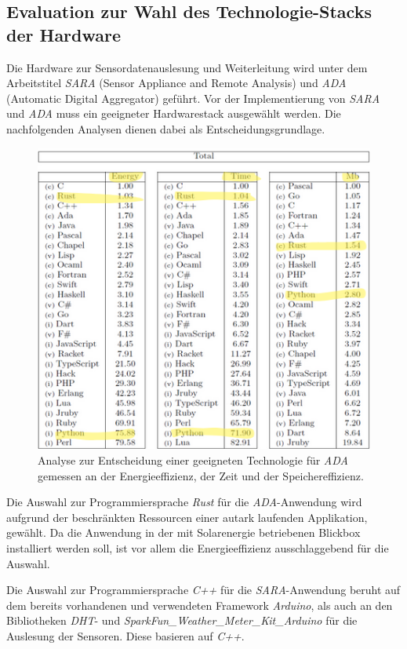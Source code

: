 \documentclass[
]{article}
\begin{document}
\subsection{Evaluation zur Wahl des Technologie-Stacks der Hardware}

Die Hardware zur Sensordatenauslesung und Weiterleitung wird unter dem Arbeitstitel \textit{SARA} (Sensor Appliance and Remote Analysis) und \textit{ADA} (Automatic Digital Aggregator) geführt. Vor der Implementierung von \textit{SARA} und \textit{ADA} muss ein geeigneter Hardwarestack ausgewählt werden. Die nachfolgenden Analysen dienen dabei als Entscheidungsgrundlage.

\begin{figure}[H]
    \centering
    \includegraphics[width=1\textwidth]{./resources/AuswahlRust.png}
    \caption{Analyse zur Entscheidung einer geeigneten Technologie für \textit{ADA} gemessen an der Energieeffizienz, der Zeit und der Speichereffizienz.}
    \label{fig:deine_label}
\end{figure}

Die Auswahl zur Programmiersprache \textit{Rust} für die \textit{ADA}-Anwendung wird aufgrund der beschränkten Ressourcen einer autark laufenden Applikation, gewählt.
Da die Anwendung in der mit Solarenergie betriebenen Blickbox installiert werden soll, ist vor allem die Energieeffizienz ausschlaggebend für die Auswahl.

Die Auswahl zur Programmiersprache \textit{C++} für die \textit{SARA}-Anwendung beruht auf dem bereits vorhandenen und verwendeten Framework \textit{Arduino}, als auch an den Bibliotheken \textit{DHT}- und \textit{SparkFun\_Weather\_Meter\_Kit\_Arduino} für die Auslesung der Sensoren. Diese basieren auf \textit{C++}.
\end{document}
